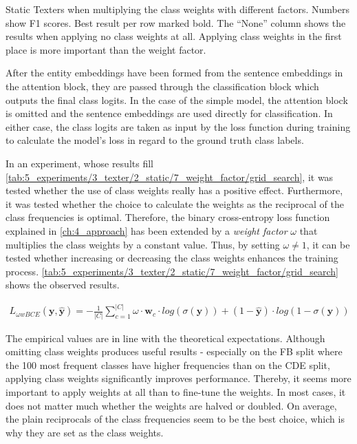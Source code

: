 \begin{table}[t]
    \centering
    
    \caption{Static Texters when multiplying the class weights with different factors. Numbers show F1 scores. Best result per row marked bold. The ``None'' column shows the results when applying no class weights at all. Applying class weights in the first place is more important than the weight factor.}
    \label{tab:5_experiments/3_texter/2_static/7_weight_factor/grid_search}
\end{table}

After the entity embeddings have been formed from the sentence embeddings in the attention block, they are passed through the classification block which outputs the final class logits. In the case of the simple model, the attention block is omitted and the sentence embeddings are used directly for classification. In either case, the class logits are taken as input by the loss function during training to calculate the model's loss in regard to the ground truth class labels.

In an experiment, whose results fill \autoref{tab:5_experiments/3_texter/2_static/7_weight_factor/grid_search}, it was tested whether the use of class weights really has a positive effect. Furthermore, it was tested whether the choice to calculate the weights as the reciprocal of the class frequencies is optimal. Therefore, the binary cross-entropy loss function explained in \autoref{ch:4_approach} has been extended by a \emph{weight factor} $\omega$ that multiplies the class weights by a constant value. Thus, by setting $\omega \neq 1$, it can be tested whether increasing or decreasing the class weights enhances the training process. \autoref{tab:5_experiments/3_texter/2_static/7_weight_factor/grid_search} shows the observed results.

\begin{align}
    L_{\omega wBCE}(\textbf{y}, \hat{\textbf{y}}) = - \frac{1}{|C|} \sum_{c = 1}^{|C|} \omega \cdot \textbf{w}_c \cdot log(\sigma(\textbf{y})) + (1 - \hat{\textbf{y}}) \cdot log(1 - \sigma(\textbf{y}))
    \label{eq:5_experiments/3_texter/2_static/7_weight_factor/wwbce}
\end{align}

The empirical values are in line with the theoretical expectations. Although omitting class weights produces useful results - especially on the FB split where the 100 most frequent classes have higher frequencies than on the CDE split, applying class weights significantly improves performance. Thereby, it seems more important to apply weights at all than to fine-tune the weights. In most cases, it does not matter much whether the weights are halved or doubled. On average, the plain reciprocals of the class frequencies seem to be the best choice, which is why they are set as the class weights.
